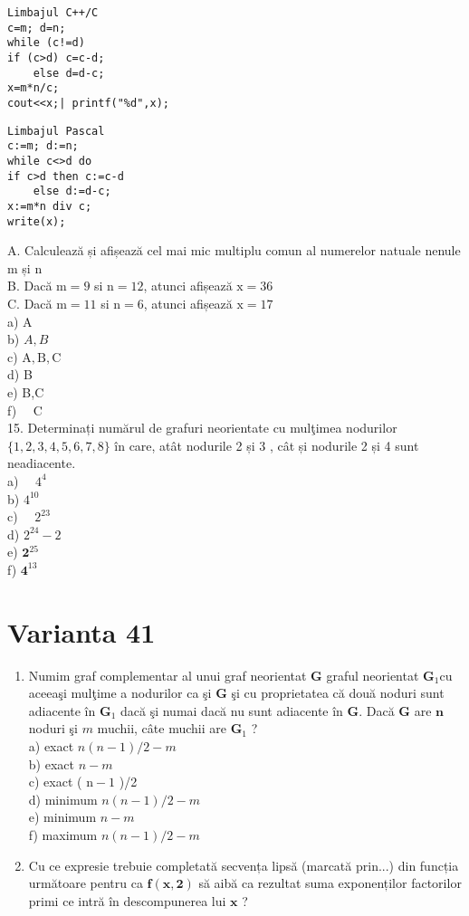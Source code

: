 \begin{verbatim}
Limbajul C++/C
c=m; d=n;
while (c!=d)
if (c>d) c=c-d;
    else d=d-c;
x=m*n/c;
cout<<x;| printf("%d",x);
\end{verbatim}

\begin{verbatim}
Limbajul Pascal
c:=m; d:=n;
while c<>d do
if c>d then c:=c-d
    else d:=d-c;
x:=m*n div c;
write(x);
\end{verbatim}

A. Calculează și afișează cel mai mic multiplu comun al numerelor natuale nenule m și n\\
B. Dacă $\mathrm{m}=9$ si $\mathrm{n}=12$, atunci afișează $\mathrm{x}=36$\\
C. Dacă $\mathrm{m}=11$ si $\mathrm{n}=6$, atunci afișează $\mathrm{x}=17$\\
a) A\\
b) $A, B$\\
c) $\mathrm{A}, \mathrm{B}, \mathrm{C}$\\
d) B\\
e) B,C\\
f) $\quad \mathrm{C}$\\
15. Determinați numărul de grafuri neorientate cu mulţimea nodurilor $\{1,2,3,4,5,6,7,8\}$ în care, atât nodurile 2 și 3 , cât și nodurile 2 și 4 sunt neadiacente.\\
a) $\quad 4^{4}$\\
b) $4^{10}$\\
c) $\quad 2^{23}$\\
d) $2^{24}-2$\\
e) $\mathbf{2}^{25}$\\
f) $\mathbf{4}^{13}$

\section*{Varianta 41}
\begin{enumerate}
  \item Numim graf complementar al unui graf neorientat $\mathbf{G}$ graful neorientat $\mathbf{G}_{1} \mathrm{cu}$ aceeaşi mulţime a nodurilor ca şi $\mathbf{G}$ şi cu proprietatea că două noduri sunt adiacente în $\mathbf{G}_{1}$ dacă şi numai dacă nu sunt adiacente în $\mathbf{G}$. Dacă $\mathbf{G}$ are $\mathbf{n}$ noduri şi $m$ muchii, câte muchii are $\mathbf{G}_{1}$ ?\\
a) exact $n(n-1) / 2-m$\\
b) exact $n-m$\\
c) exact ( $\mathrm{n}-1$ )/2\\
d) minimum $n(n-1) / 2-m$\\
e) minimum $n-m$\\
f) maximum $n(n-1) / 2-m$
  \item Cu ce expresie trebuie completată secvența lipsă (marcată prin...) din funcția următoare pentru ca $\mathbf{f ( x , 2 )}$ să aibă ca rezultat suma exponenților factorilor primi ce intră în descompunerea lui $\mathbf{x}$ ?
\end{enumerate}

